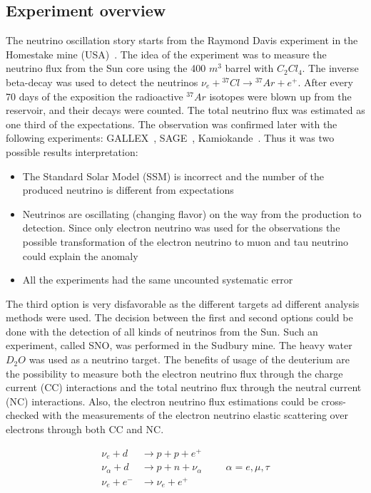 \documentclass[../main.tex]{subfiles}
\begin{document}
\subsection{Experiment overview}
\label{sec:intro:osc_exp}
The neutrino oscillation story starts from the Raymond Davis experiment in the Homestake mine (USA)~\cite{Davis1968}. The idea of the experiment was to measure the neutrino flux from the Sun core using the 400 ${m^3}$ barrel with ${C_2Cl_4}$. The inverse beta-decay was used to detect the neutrinos $\nu_e+{}^{37}Cl\to{}^{37}Ar+e^+$. After every 70 days of the exposition the radioactive ${}^{37}Ar$ isotopes were blown up from the reservoir, and their decays were counted. The total neutrino flux was estimated as one third of the expectations. The observation was confirmed later with the following experiments: GALLEX~\cite{Kirsten1999}, SAGE~\cite{Abdurashitov1999}, Kamiokande~\cite{Oyama1989}. Thus it was two possible results interpretation:
\begin{itemize}
  \item The Standard Solar Model (SSM) is incorrect and the number of the produced neutrino is different from expectations
  \item Neutrinos are oscillating (changing flavor) on the way from the production to detection. Since only electron neutrino was used for the observations the possible transformation of the electron neutrino to muon and tau neutrino could explain the anomaly
  \item All the experiments had the same uncounted systematic error
\end{itemize}
The third option is very disfavorable as the different targets ad different analysis methods were used. The decision between the first and second options could be done with the detection of all kinds of neutrinos from the Sun. Such an experiment, called SNO, was performed in the Sudbury mine. The heavy water $D_2O$ was used as a neutrino target. The benefits of usage of the deuterium are the possibility to measure both the electron neutrino flux through the charge current (CC) interactions and the total neutrino flux through the neutral current (NC) interactions. Also, the electron neutrino flux estimations could be cross-checked with the measurements of the electron neutrino elastic scattering over electrons through both CC and NC.

\begin{align}
\nu_e+d&\to p+p+e^+ \\
\nu_\alpha+d&\to p+n+\nu_\alpha\hspace{1cm} \alpha =e,\mu,\tau \\
\nu_e+e^-&\to\nu_e+e^+
\end{align}
\end{document}
